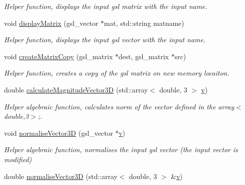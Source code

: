 \begin{DoxyCompactItemize}
\begin{DoxyCompactList}\small\item\em Helper function, displays the input gsl matrix with the input name. \end{DoxyCompactList}\item 
\hypertarget{classShapeBase_a0283ac144e865859f4e7bb455e06bee9}{}void \hyperlink{classShapeBase_a0283ac144e865859f4e7bb455e06bee9}{display\+Matrix} (gsl\+\_\+vector $\ast$mat, std\+::string matname)\label{classShapeBase_a0283ac144e865859f4e7bb455e06bee9}

\begin{DoxyCompactList}\small\item\em Helper function, displays the input gsl vector with the input name. \end{DoxyCompactList}\item 
\hypertarget{classShapeBase_a4b37ec963a6078a7e03512d23470c257}{}void \hyperlink{classShapeBase_a4b37ec963a6078a7e03512d23470c257}{create\+Matrix\+Copy} (gsl\+\_\+matrix $\ast$dest, gsl\+\_\+matrix $\ast$src)\label{classShapeBase_a4b37ec963a6078a7e03512d23470c257}

\begin{DoxyCompactList}\small\item\em Helper function, creates a copy of the gsl matrix on new memory locaiton. \end{DoxyCompactList}\item 
\hypertarget{classShapeBase_a31f6cfbda8b021fd4e55ca1e3676f7c6}{}double \hyperlink{classShapeBase_a31f6cfbda8b021fd4e55ca1e3676f7c6}{calculate\+Magnitude\+Vector3\+D} (std\+::array$<$ double, 3 $>$ \hyperlink{classShapeBase_a8b4c2d3bfbc6c9785c5181a56f929151}{v})\label{classShapeBase_a31f6cfbda8b021fd4e55ca1e3676f7c6}

\begin{DoxyCompactList}\small\item\em Helper algebraic function, calculates norm of the vector defined in the array$<$double,3$>$;. \end{DoxyCompactList}\item 
\hypertarget{classShapeBase_a9e7ca6bbc30107ed82e73694f9c34717}{}void \hyperlink{classShapeBase_a9e7ca6bbc30107ed82e73694f9c34717}{normalise\+Vector3\+D} (gsl\+\_\+vector $\ast$\hyperlink{classShapeBase_a8b4c2d3bfbc6c9785c5181a56f929151}{v})\label{classShapeBase_a9e7ca6bbc30107ed82e73694f9c34717}

\begin{DoxyCompactList}\small\item\em Helper algebraic function, normalises the input gsl vector (the input vector is modified) \end{DoxyCompactList}\item 
\hypertarget{classShapeBase_acefffe34f00f3e65c0894dacdc5f5bf5}{}double \hyperlink{classShapeBase_acefffe34f00f3e65c0894dacdc5f5bf5}{normalise\+Vector3\+D} (std\+::array$<$ double, 3 $>$ \&\hyperlink{classShapeBase_a8b4c2d3bfbc6c9785c5181a56f929151}{v})\label{classShapeBase_acefffe34f00f3e65c0894dacdc5f5bf5}


\end{DoxyCompactItemize}
